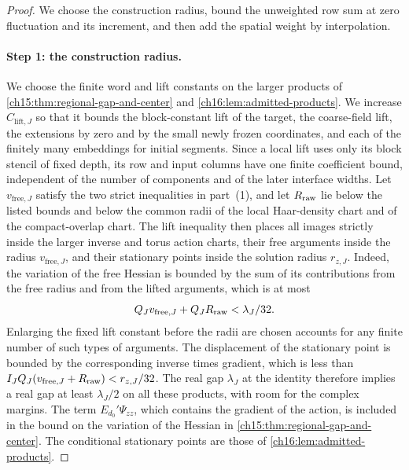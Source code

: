 \begin{proof}
We choose the construction radius, bound the unweighted row sum at zero fluctuation and its increment, and then add the spatial weight by interpolation.

\paragraph{Step 1: the construction radius.}
We choose the finite word and lift constants on the larger products of \cref{ch15:thm:regional-gap-and-center} and \cref{ch16:lem:admitted-products}. We increase $C_{\mathrm{lift},J}$ so that it bounds the block-constant lift of the target, the coarse-field lift, the extensions by zero and by the small newly frozen coordinates, and each of the finitely many embeddings for initial segments. Since a local lift uses only its block stencil of fixed depth, its row and input columns have one finite coefficient bound, independent of the number of components and of the later interface widths. Let $v_{\mathrm{free},J}$ satisfy the two strict inequalities in part~(1), and let $R_{\mathrm{raw}}$ lie below the listed bounds and below the common radii of the local Haar-density chart and of the compact-overlap chart. The lift inequality then places all images strictly inside the larger inverse and torus action charts, their free arguments inside the radius $v_{\mathrm{free},J}$, and their stationary points inside the solution radius $r_{z,J}$. Indeed, the variation of the free Hessian is bounded by the sum of its contributions from the free radius and from the lifted arguments, which is at most
\[
 Q_Jv_{\mathrm{free},J}+Q_JR_{\mathrm{raw}}<\lambda_J/32.
\]
Enlarging the fixed lift constant before the radii are chosen accounts for any finite number of such types of arguments. The displacement of the stationary point is bounded by the corresponding inverse times gradient, which is less than $I_JQ_J(v_{\mathrm{free},J}+R_{\mathrm{raw}})<r_{z,J}/32$. The real gap $\lambda_J$ at the identity therefore implies a real gap at least $\lambda_J/2$ on all these products, with room for the complex margins. The term $E_{d_0}'\Psi_{zz}$, which contains the gradient of the action, is included in the bound on the variation of the Hessian in \cref{ch15:thm:regional-gap-and-center}. The conditional stationary points are those of \cref{ch16:lem:admitted-products}.


\end{proof}
